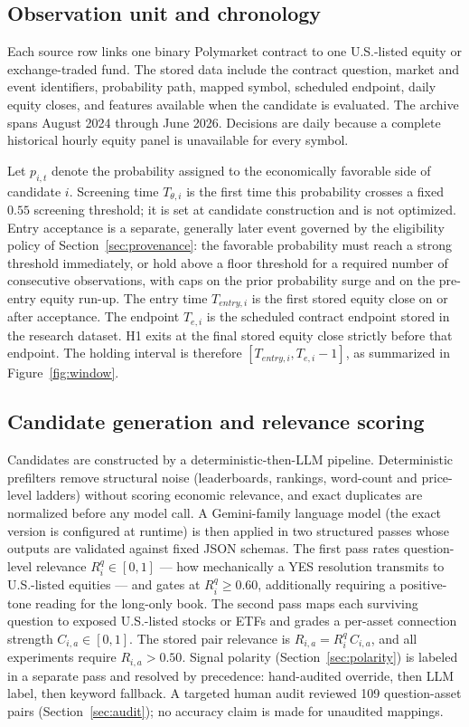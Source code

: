 \documentclass[sigconf,anonymous]{acmart}
\begin{document}
\subsection{Observation unit and chronology}

Each source row links one binary Polymarket contract to one U.S.-listed equity or exchange-traded fund. The stored data include the contract question, market and event identifiers, probability path, mapped symbol, scheduled endpoint, daily equity closes, and features available when the candidate is evaluated. The archive spans August 2024 through June 2026. Decisions are daily because a complete historical hourly equity panel is unavailable for every symbol.

Let $p_{i,t}$ denote the probability assigned to the economically favorable side of candidate $i$. Screening time $T_{\theta,i}$ is the first time this probability crosses a fixed $0.55$ screening threshold; it is set at candidate construction and is not optimized. Entry acceptance is a separate, generally later event governed by the eligibility policy of Section~\ref{sec:provenance}: the favorable probability must reach a strong threshold immediately, or hold above a floor threshold for a required number of consecutive observations, with caps on the prior probability surge and on the pre-entry equity run-up. The entry time $T_{entry,i}$ is the first stored equity close on or after acceptance. The endpoint $T_{e,i}$ is the scheduled contract endpoint stored in the research dataset. H1 exits at the final stored equity close strictly before that endpoint. The holding interval is therefore $[T_{entry,i},T_{e,i}-1]$, as summarized in Figure~\ref{fig:window}.

\subsection{Candidate generation and relevance scoring}
\label{sec:gemini}

Candidates are constructed by a deterministic-then-LLM pipeline. Deterministic prefilters remove structural noise (leaderboards, rankings, word-count and price-level ladders) without scoring economic relevance, and exact duplicates are normalized before any model call. A Gemini-family language model (the exact version is configured at runtime) is then applied in two structured passes whose outputs are validated against fixed JSON schemas. The first pass rates question-level relevance $R^q_i\in[0,1]$ --- how mechanically a YES resolution transmits to U.S.-listed equities --- and gates at $R^q_i\ge 0.60$, additionally requiring a positive-tone reading for the long-only book. The second pass maps each surviving question to exposed U.S.-listed stocks or ETFs and grades a per-asset connection strength $C_{i,a}\in[0,1]$. The stored pair relevance is $R_{i,a}=R^q_i\,C_{i,a}$, and all experiments require $R_{i,a}>0.50$. Signal polarity (Section~\ref{sec:polarity}) is labeled in a separate pass and resolved by precedence: hand-audited override, then LLM label, then keyword fallback. A targeted human audit reviewed 109 question-asset pairs (Section~\ref{sec:audit}); no accuracy claim is made for unaudited mappings.
\end{document}
